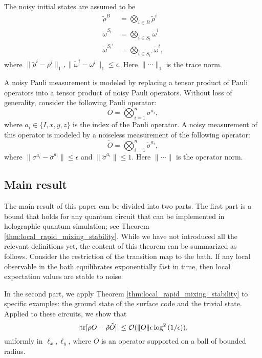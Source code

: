 \documentclass[prx,aps,amsmath,amssymb,floatfix,superscriptaddress,11pt,tightenlines,longbibliography,onecolumn,notitlepage]{revtex4-1}
\newcommand{\Tr}{\textnormal{tr}}
\begin{document}
The noisy initial states are assumed to be
\begin{equation}
  \begin{aligned}
    \tilde{\rho}^B &= \bigotimes_{i\in B} \tilde{\rho}^i\\
    \tilde{\omega}^{S_t} &= \bigotimes_{i\in S_t} \tilde{\omega}^i \\
    \tilde{\omega}^{S_t'} &= \bigotimes_{i\in S_t'} \tilde{\omega}^i,
    \end{aligned}
\end{equation}
where $\|\tilde{\rho}^i -\rho^i \|_1, \|\tilde{\omega}^i - \omega^i\|_1 \leq \epsilon$. Here $\| \cdots \|_1$ is the trace norm.

A noisy Pauli measurement is modeled by replacing a tensor product of Pauli operators into a tensor product of noisy Pauli operators. Without loss of generality, consider the following Pauli operator:
\begin{equation}
O = \bigotimes_{i=1}^n \sigma^{a_i},
\end{equation}
where $a_i\in \{I,x,y,z \}$ is the index of the Pauli operator. A noisy measurement of this operator is modeled by a noiseless measurement of the following operator:
\begin{equation}
\tilde{O} = \bigotimes_{i=1}^{n} \tilde{\sigma}^{a_i},
\end{equation}
where $\|\sigma^{a_i} - \tilde{\sigma}^{a_i} \|\leq \epsilon$ and $\|\tilde{\sigma}^{a_i} \|\leq 1$. Here $\|\cdots \|$ is the operator norm.

\subsection{Main result\label{section:main}}
The main result of this paper can be divided into two parts. The first part is a bound that holds for any quantum circuit that can be implemented in holographic quantum simulation; see Theorem \ref{thm:local_rapid_mixing_stability}. While we have not introduced all the relevant definitions yet, the content of this theorem can be summarized as follows. Consider the restriction of the transition map to the bath. If any local observable in the bath equilibrates exponentially fast in time, then local expectation values are stable to noise. 

In the second part, we apply Theorem \ref{thm:local_rapid_mixing_stability} to specific examples: the ground state of the surface code and the trivial state. Applied to these circuits, we show that
\begin{equation}
  |\Tr[\rho O - \tilde{\rho}\tilde{O}]| \leq \mathcal{O}(\|O \| \epsilon \log^2\left(1/\epsilon\right)),\label{eq:main}
\end{equation}
uniformly in $\ell_x,\ell_y$, where $O$ is an operator supported on a ball of bounded radius.
\end{document}
